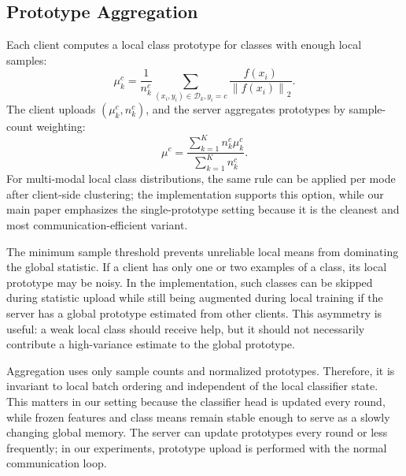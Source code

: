 ﻿\documentclass[runningheads]{llncs}
\newcommand{\norm}[1]{\left\lVert #1 \right\rVert}
\begin{document}
\subsection{Prototype Aggregation}
Each client computes a local class prototype for classes with enough local samples:
\begin{equation}
\mu_k^c = \frac{1}{n_k^c}\sum_{(x_i,y_i)\in\mathcal{D}_k, y_i=c} \frac{f(x_i)}{\norm{f(x_i)}_2}.
\end{equation}
The client uploads $(\mu_k^c,n_k^c)$, and the server aggregates prototypes by sample-count weighting:
\begin{equation}
\mu^c = \frac{\sum_{k=1}^{K} n_k^c \mu_k^c}{\sum_{k=1}^{K} n_k^c}.
\end{equation}
For multi-modal local class distributions, the same rule can be applied per mode after client-side clustering; the implementation supports this option, while our main paper emphasizes the single-prototype setting because it is the cleanest and most communication-efficient variant.

The minimum sample threshold prevents unreliable local means from dominating the global statistic. If a client has only one or two examples of a class, its local prototype may be noisy. In the implementation, such classes can be skipped during statistic upload while still being augmented during local training if the server has a global prototype estimated from other clients. This asymmetry is useful: a weak local class should receive help, but it should not necessarily contribute a high-variance estimate to the global prototype.

Aggregation uses only sample counts and normalized prototypes. Therefore, it is invariant to local batch ordering and independent of the local classifier state. This matters in our setting because the classifier head is updated every round, while frozen features and class means remain stable enough to serve as a slowly changing global memory. The server can update prototypes every round or less frequently; in our experiments, prototype upload is performed with the normal communication loop.
\end{document}
